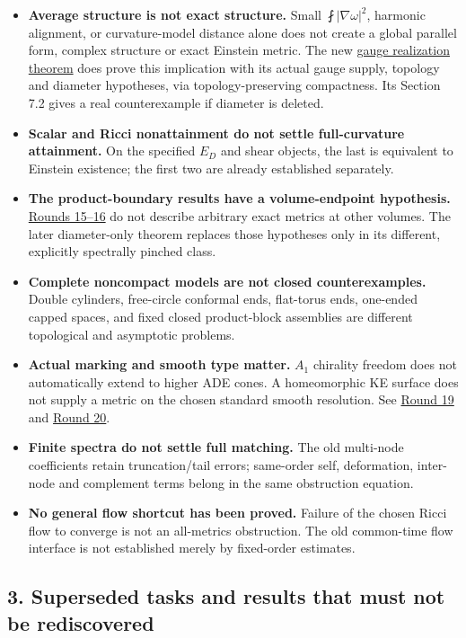 \documentclass[
  10pt,
]{article}
\begin{document}
\begin{itemize}
  every Einstein Weyl tensor.
\item
  \textbf{Average structure is not exact structure.} Small
  \(\fint|\nabla\omega|^2\), harmonic alignment, or curvature-model
  distance alone does not create a global parallel form, complex
  structure or exact Einstein metric. The new
  \href{../continuation/20260923_gauge_saturation_ke.md}{gauge
  realization theorem} does prove this implication with its actual gauge
  supply, topology and diameter hypotheses, via topology-preserving
  compactness. Its Section 7.2 gives a real counterexample if diameter
  is deleted.
\item
  \textbf{Scalar and Ricci nonattainment do not settle full-curvature
  attainment.} On the specified \(E_D\) and shear objects, the last is
  equivalent to Einstein existence; the first two are already
  established separately.
\item
  \textbf{The product-boundary results have a volume-endpoint
  hypothesis.} \href{../mathematics/current/round16.md}{Rounds 15--16}
  do not describe arbitrary exact metrics at other volumes. The later
  diameter-only theorem replaces those hypotheses only in its different,
  explicitly spectrally pinched class.
\item
  \textbf{Complete noncompact models are not closed counterexamples.}
  Double cylinders, free-circle conformal ends, flat-torus ends,
  one-ended capped spaces, and fixed closed product-block assemblies are
  different topological and asymptotic problems.
\item
  \textbf{Actual marking and smooth type matter.} \(A_1\) chirality
  freedom does not automatically extend to higher ADE cones. A
  homeomorphic KE surface does not supply a metric on the chosen
  standard smooth resolution. See
  \href{../mathematics/current/round19_positive_bridge.md}{Round 19} and
  \href{../mathematics/current/round20_global.md}{Round 20}.
\item
  \textbf{Finite spectra do not settle full matching.} The old
  multi-node coefficients retain truncation/tail errors; same-order
  self, deformation, inter-node and complement terms belong in the same
  obstruction equation.
\item
  \textbf{No general flow shortcut has been proved.} Failure of the
  chosen Ricci flow to converge is not an all-metrics obstruction. The
  old common-time flow interface is not established merely by
  fixed-order estimates.
\end{itemize}

\hypertarget{superseded-tasks-and-results-that-must-not-be-rediscovered}{%
\subsection{3. Superseded tasks and results that must not be
rediscovered}\label{superseded-tasks-and-results-that-must-not-be-rediscovered}}
\end{document}
